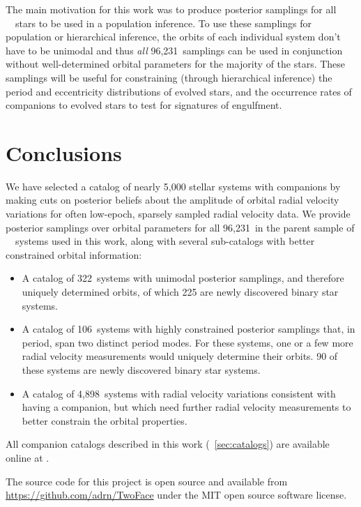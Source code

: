 \documentclass[modern, letterpaper]{aastex62}
\newcommand{\apogee}{\project{\acronym{APOGEE}}}
\newcommand{\DR}{\acronym{DR14}}
\newcommand{\nstars}{96,231}
\newcommand{\nhighK}{4,898}
\newcommand{\nbimodal}{106}
\newcommand{\nunimodal}{322}
\begin{document}
The main motivation for this work was to produce posterior samplings for all
\apogee\ \DR\ stars to be used in a population inference.
To use these samplings for population or hierarchical inference, the orbits of
each individual system don't have to be unimodal and thus \emph{all} \nstars\
samplings can be used in conjunction without well-determined orbital parameters
for the majority of the stars.
These samplings will be useful for constraining (through hierarchical inference)
the period and eccentricity distributions of evolved stars, and the occurrence
rates of companions to evolved stars to test for signatures of engulfment.

\section{Conclusions}

We have selected a catalog of nearly 5,000 stellar systems with companions by
making cuts on posterior beliefs about the amplitude of orbital radial velocity
variations for often low-epoch, sparsely sampled radial velocity data.
We provide posterior samplings over orbital parameters for all \nstars\ in the
parent sample of \apogee\ \DR\ systems used in this work, along with several
sub-catalogs with better constrained orbital information:
\begin{itemize}
    \item A catalog of \nunimodal\ systems with unimodal posterior samplings,
    and therefore uniquely determined orbits, of which 225 are newly discovered
    binary star systems.
    \item A catalog of \nbimodal\ systems with highly constrained posterior
    samplings that, in period, span two distinct period modes.
    For these systems, one or a few more radial velocity measurements would
    uniquely determine their orbits.
    90 of these systems are newly discovered binary star systems.
    \item A catalog of \nhighK\ systems with radial velocity variations
    consistent with having a companion, but which need further radial velocity
    measurements to better constrain the orbital properties.
\end{itemize}
All companion catalogs described in this work (\sectionname~\ref{sec:catalogs})
are available online at \todo{XX}.

The source code for this project is open source and available from
\url{https://github.com/adrn/TwoFace} under the MIT open source software
license.
\end{document}
